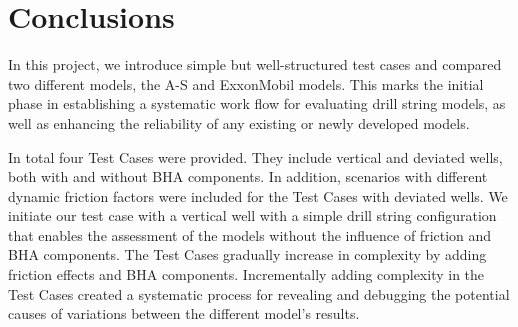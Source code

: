 \section{Conclusions}
In this project, we introduce simple but well-structured test cases and compared two different models, the A-S and ExxonMobil models. This marks the initial phase in establishing a systematic work flow for evaluating drill string models, as well as enhancing the reliability of any existing or newly developed models.

In total four Test Cases were provided. They include vertical and deviated wells, both with and without BHA components. In addition, scenarios with different dynamic friction factors were included for the Test Cases with deviated wells. We initiate our test case with a vertical well with a simple drill string configuration that enables the assessment of the models without the influence of friction and BHA components. The Test Cases gradually increase in complexity by adding friction effects and BHA components. Incrementally adding complexity in the Test Cases created a systematic process for revealing and debugging the potential causes of variations between the different model's results.

